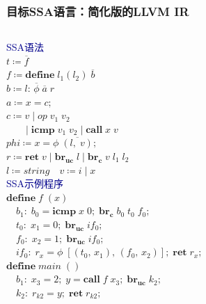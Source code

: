 \begin{frame}
    \frametitle{目标SSA语言：简化版的LLVM IR}
    \begin{columns}[t, onlytextwidth]
    \textcolor{DarkBlue}{SSA语法}\\
    \vspace{1ex}
    $t \coloneqq \overline{f}$ \\
    $  f \coloneqq \mathbf{define}\; l_1(l_2)\; \overline{b}$ \\
    $b \coloneqq l:\, \overline{\phi}\; \overline{a}\; r$ \\
    $a \coloneqq x = c;$ \\
    $ c \coloneqq v\; |\; op\; v_1\; v_2$\\
    $\quad\quad |\; \mathbf{icmp}\; v_1\; v_2\; |\; \mathbf{call}\; x\; v  $ \\
    \vspace{1ex}
    $ phi \coloneqq x = \phi \; \overline{(l,\; v)};$\\
    $r \coloneqq \mathbf{ret}\; v\; |\; \mathbf{br_{uc}}\; l\; |\; \mathbf{br_c}\; v\; l_1\; l_2$\\
    $  l \coloneqq string \quad  v \coloneqq i\; |\; x$\\
    
    \textcolor{DarkBlue}{SSA示例程序}\\
    \vspace{1ex}
        $\mathbf{define}\; f\; (x)$\\
        $\quad b_1:\; b_0 = \mathbf{icmp}\; x\; 0;\; \mathbf{br_c}\; b_0\; t_0\; f_0;$ \\
        $\quad t_0:\; x_1 = 0;\; \mathbf{br_{uc}}\; if_0;$ \\
        $\quad f_0:\; x_2 = 1;\; \mathbf{br_{uc}}\; if_0;$\\
        $\quad if_0:\; r_x = \phi \; [(t_0,\, x_1),\, (f_0,\, x_2)];\; \mathbf{ret}\; r_x;$ \\
        \vspace{1ex}
        $\mathbf{define}\; main\; ( )$\\
        $\quad b_1:\; x_3 = 2;\; y = \mathbf{call}\; f\; x_3;\; \mathbf{br_{uc}}\; k_2;$\\
        $\quad k_2:\; r_{k2} = y;\; \mathbf{ret}\; r_{k2};$ \\
    \end{columns}
\end{frame}

